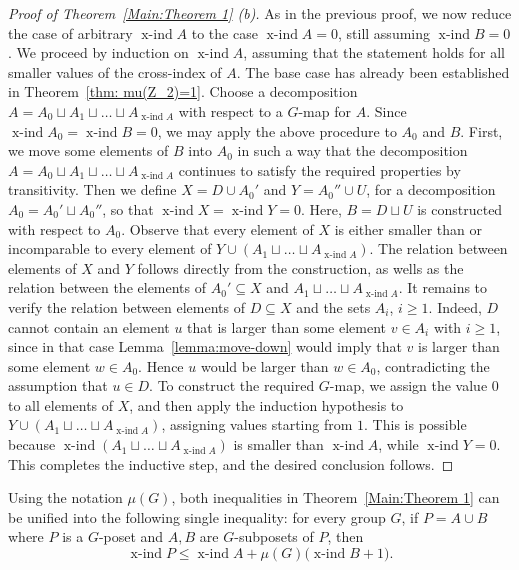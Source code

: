 \documentclass[preprint,12pt]{article}
\renewcommand{\le}{\leqslant}
\renewcommand{\ge}{\geqslant}
\theoremstyle{definition}
\theoremstyle{remark}
\numberwithin{equation}{section}
\DeclareMathOperator{\xind}{x-ind}
\begin{document}
\begin{proof}[Proof of Theorem~\ref{Main:Theorem 1} (b)]
As in the previous proof, we now reduce the case of arbitrary \(\xind A\) to the case \(\xind A = 0\), still assuming \(\xind B = 0\). We proceed by induction on \(\xind A\), assuming that the statement holds for all smaller values of the cross-index of \(A\). The base case has already been established in Theorem~\ref{thm: mu(Z_2)=1}. Choose a decomposition \(A = A_0 \sqcup A_1 \sqcup \dots \sqcup A_{\xind A}\) with respect to a \(G\)-map for \(A\). Since \(\xind A_0 = \xind B = 0\), we may apply the above procedure to \(A_0\) and \(B\). First, we move some elements of \(B\) into \(A_0\) in such a way that the decomposition \(A = A_0 \sqcup A_1 \sqcup \dots \sqcup A_{\xind A}\) continues to satisfy the required properties by transitivity. Then we define \(X = D \cup A_0'\) and \(Y = A_0'' \cup U\), for a decomposition \(A_0 = A_0' \sqcup A_0''\), so that \(\xind X = \xind Y = 0\). Here, \(B = D \sqcup U\) is constructed with respect to \(A_0\). Observe that every element of \(X\) is either smaller than or incomparable to every element of \(Y \cup (A_1 \sqcup \dots \sqcup A_{\xind A})\). The relation between elements of \(X\) and \(Y\) follows directly from the construction, as wells as the relation between the elements of $A_0'\subseteq X$ and $A_1 \sqcup \dots \sqcup A_{\xind A}$. It remains to verify the relation between elements of $D\subseteq X$ and the sets \(A_i\), $i\ge 1$. Indeed, \(D\) cannot contain an element \(u\) that is larger than some element \(v \in A_i\) with \(i \ge 1\), since in that case Lemma~\ref{lemma:move-down} would imply that \(v\) is larger than some element \(w \in A_0\). Hence \(u\) would be larger than \(w \in A_0\), contradicting the assumption that \(u \in D\). To construct the required \(G\)-map, we assign the value \(0\) to all elements of \(X\), and then apply the induction hypothesis to \(Y \cup (A_1 \sqcup \dots \sqcup A_{\xind A})\), assigning values starting from \(1\). This is possible because \(\xind(A_1 \sqcup \dots \sqcup A_{\xind A})\) is smaller than \(\xind A\), while \(\xind Y = 0\). This completes the inductive step, and the desired conclusion follows.
\end{proof}


Using the notation \(\mu(G)\), both inequalities in Theorem~\ref{Main:Theorem 1} can be unified into the following single inequality: for every group \(G\), if \(P = A \cup B\) where \(P\) is a \(G\)-poset and \(A,B\) are \(G\)-subposets of \(P\), then
\begin{equation}
\label{unified inequality}
\xind P \le \xind A + \mu(G)\bigl(\xind B + 1\bigr).
\end{equation}
\end{document}
